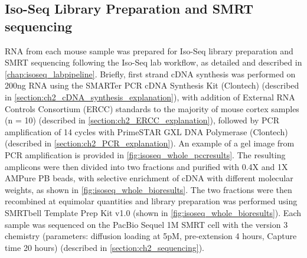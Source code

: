\subsection{Iso-Seq Library Preparation and SMRT sequencing}\label{ch4_methods: isoseq_library}
RNA from each mouse sample was prepared for Iso-Seq library preparation and SMRT sequencing following the Iso-Seq lab workflow, as detailed and described in \cref{chap:isoseq_labpipeline}. Briefly, first strand cDNA synthesis was performed on 200ng RNA using the SMARTer PCR cDNA Synthesis Kit (Clontech) (described in \cref{section:ch2_cDNA_synthesis_explanation}), with addition of External RNA Controls Consortium (ERCC) standards to the majority of mouse cortex samples (n = 10) (described in \cref{section:ch2_ERCC_explanation}), followed by PCR amplification of 14 cycles with PrimeSTAR GXL DNA Polymerase (Clontech) (described in \cref{section:ch2_PCR_explanation}). An example of a gel image from PCR amplification is provided in \cref{fig:isoseq_whole_pccresults}. The resulting amplicons were then divided into two fractions and purified with 0.4X and 1X AMPure PB beads, with selective enrichment of cDNA with different molecular weights, as shown in \cref{fig:isoseq_whole_bioresults}. The two fractions were then recombined at equimolar quantities and library preparation was performed using SMRTbell Template Prep Kit v1.0 (shown in \cref{fig:isoseq_whole_bioresults}). Each sample was sequenced on the PacBio Sequel 1M SMRT cell with the version 3 chemistry (parameters: diffusion loading at 5pM, pre-extension 4 hours, Capture time 20 hours) (described in \cref{section:ch2_sequencing}).

